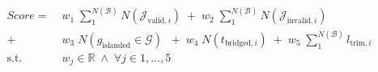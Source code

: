 \begin{equation}
 \begin{aligned}
 Score =  &\; w_1\;  \sum_{1}^{N(\mathcal{B})} N(\mathcal{J}_{\text{valid},i})\; +  \;w_2\; \sum_{1}^{N(\mathcal{B})} N(\mathcal{J}_{\text{invalid},i})\\
		+ &\; w_3\;  N(g_{\text{islanded}} \in \mathcal{G} )\;				 	 \;+  \;w_4\;  N(t_{\text{bridged}, i}) \; +  \;w_5\; \sum_{1}^{N(\mathcal{B})} l_{\text{trim}, i}
 \\
   \textrm{s.t.} & \; w_j  \in \mathbb{R} \; \wedge \;   \forall j \in 1, \dotsc , 5
 \end{aligned}
 \label{eq:score}
\end{equation}
